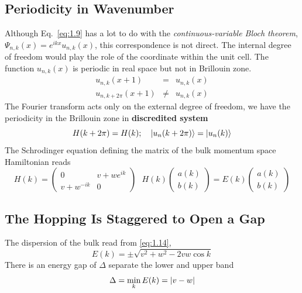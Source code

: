 \subsection{Periodicity in Wavenumber}\label{se:1.2.2}
Although Eq.~\ref{eq:1.9} has a lot to do with the \textit{continuous-variable Bloch theorem}, $\Psi_{n,k}(x) = e^{ikx}u_{n,k}(x)$, this correspondence is not direct.
The internal degree of freedom would play the role of the coordinate within the unit cell.
The function $u_{n,k}(x)$ is periodic in real space but not in Brillouin zone.
\begin{eqnarray}
    u_{n,k}(x+1) &=&u_{n,k}(x) \\
    u_{n,k+2\pi}(x+1) &\neq& u_{n,k}(x)
\end{eqnarray}
The Fourier transform acts only on the external degree of freedom, we have the periodicity in the Brillouin zone in \textbf{discredited system}
\begin{equation}
    H(k+2\pi) = H(k);~ ~ ~ \ket{u_n(k+2\pi)} = \ket{u_n(k)}
    \label{eq:1.12}
\end{equation}
The Schrodinger equation defining the matrix of the bulk momentum space Hamiltonian reads
\begin{equation} \label{eq:1.14}
    H(k) = \begin{pmatrix}
        0 & v+we^{ik} \\
        v+w^{-ik} & 0
    \end{pmatrix}
    ~ ~ ~
    H(k)
    \begin{pmatrix}
        a(k)\\
        b(k)
    \end{pmatrix}
    = E(k)
    \begin{pmatrix}
        a(k)\\
        b(k)
    \end{pmatrix}
\end{equation}

\subsection{The Hopping Is Staggered to Open a Gap}\label{sec:1.2.3}
The dispersion of the bulk read from \eqref{eq:1.14},
\begin{equation}
    E(k) = \pm \sqrt{v^2 +w^2 -2vw \cos k}
    \label{eq:1.15}
\end{equation}
There is an energy gap of $\Delta$ separate the lower and upper band
\begin{equation}
    \Delta = \min_k E(k) = \abs{v-w}
    \label{eq:1.16}
\end{equation}


